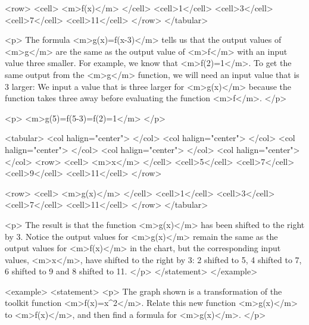                     <row>
                        <cell> <m>f(x)</m> </cell>
                        <cell>1</cell>
                        <cell>3</cell>
                        <cell>7</cell>
                        <cell>11</cell>
                    </row>
                </tabular>

                <p>
                    The formula <m>g(x)=f(x-3)</m> tells us that the output values of <m>g</m> are the same as the output value of <m>f</m> with an input value three smaller.
                    For example, we know that <m>f(2)=1</m>.
                    To get the same output from the <m>g</m> function, we will need an input value that is 3 larger: We input a value that is three larger for <m>g(x)</m> because the function takes three away before evaluating the function <m>f</m>.
                </p>

                <p>
                    <m>g(5)=f(5-3)=f(2)=1</m>
                </p>

                <tabular>
                    <col halign="center"> </col> <col halign="center"> </col> <col halign="center"> </col> <col halign="center"> </col> <col halign="center"> </col>
                    <row>
                        <cell> <m>x</m> </cell>
                        <cell>5</cell>
                        <cell>7</cell>
                        <cell>9</cell>
                        <cell>11</cell>
                    </row>

                    <row>
                        <cell> <m>g(x)</m> </cell>
                        <cell>1</cell>
                        <cell>3</cell>
                        <cell>7</cell>
                        <cell>11</cell>
                    </row>
                </tabular>

                <p>
                    The result is that the function <m>g(x)</m> has been shifted to the right by 3.
                    Notice the output values for <m>g(x)</m> remain the same as the output values for <m>f(x)</m> in the chart, but the corresponding input values, <m>x</m>, have shifted to the right by 3: 2 shifted to 5, 4 shifted to 7, 6 shifted to 9 and 8 shifted to 11.
                </p>
            </statement>
        </example>

        <example>
            <statement>
                <p>
                    The graph shown is a transformation of the toolkit function <m>f(x)=x^{2}</m>.
                    Relate this new function <m>g(x)</m> to <m>f(x)</m>, and then find a formula for <m>g(x)</m>.
                </p>

